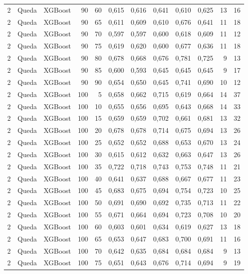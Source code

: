 \begin{longtable}{@{}rllrrrrrrrrr@{}}
2 & Queda & XGBoost & 90 & 60 & 0,615 & 0,616 & 0,641 & 0,610 & 0,625 & 13 & 16 \\
2 & Queda & XGBoost & 90 & 65 & 0,611 & 0,609 & 0,610 & 0,676 & 0,641 & 11 & 18 \\
2 & Queda & XGBoost & 90 & 70 & 0,597 & 0,597 & 0,600 & 0,618 & 0,609 & 11 & 12 \\
2 & Queda & XGBoost & 90 & 75 & 0,619 & 0,620 & 0,600 & 0,677 & 0,636 & 11 & 18 \\
2 & Queda & XGBoost & 90 & 80 & 0,678 & 0,668 & 0,676 & 0,781 & 0,725 & 9 & 13 \\
2 & Queda & XGBoost & 90 & 85 & 0,600 & 0,593 & 0,645 & 0,645 & 0,645 & 9 & 17 \\
2 & Queda & XGBoost & 90 & 90 & 0,654 & 0,650 & 0,645 & 0,741 & 0,690 & 10 & 12 \\
2 & Queda & XGBoost & 100 & 5 & 0,658 & 0,662 & 0,715 & 0,619 & 0,664 & 14 & 37 \\
2 & Queda & XGBoost & 100 & 10 & 0,655 & 0,656 & 0,695 & 0,643 & 0,668 & 14 & 33 \\
2 & Queda & XGBoost & 100 & 15 & 0,659 & 0,659 & 0,702 & 0,661 & 0,681 & 13 & 32 \\
2 & Queda & XGBoost & 100 & 20 & 0,678 & 0,678 & 0,714 & 0,675 & 0,694 & 13 & 26 \\
2 & Queda & XGBoost & 100 & 25 & 0,652 & 0,652 & 0,688 & 0,653 & 0,670 & 13 & 24 \\
2 & Queda & XGBoost & 100 & 30 & 0,615 & 0,612 & 0,632 & 0,663 & 0,647 & 13 & 26 \\
2 & Queda & XGBoost & 100 & 35 & 0,722 & 0,718 & 0,743 & 0,753 & 0,748 & 11 & 21 \\
2 & Queda & XGBoost & 100 & 40 & 0,641 & 0,637 & 0,688 & 0,667 & 0,677 & 11 & 23 \\
2 & Queda & XGBoost & 100 & 45 & 0,683 & 0,675 & 0,694 & 0,754 & 0,723 & 10 & 25 \\
2 & Queda & XGBoost & 100 & 50 & 0,691 & 0,690 & 0,692 & 0,735 & 0,713 & 11 & 22 \\
2 & Queda & XGBoost & 100 & 55 & 0,671 & 0,664 & 0,694 & 0,723 & 0,708 & 10 & 20 \\
2 & Queda & XGBoost & 100 & 60 & 0,603 & 0,601 & 0,634 & 0,619 & 0,627 & 13 & 18 \\
2 & Queda & XGBoost & 100 & 65 & 0,653 & 0,647 & 0,683 & 0,700 & 0,691 & 11 & 16 \\
2 & Queda & XGBoost & 100 & 70 & 0,642 & 0,635 & 0,684 & 0,684 & 0,684 & 9 & 13 \\
2 & Queda & XGBoost & 100 & 75 & 0,651 & 0,643 & 0,676 & 0,714 & 0,694 & 9 & 19 \\

\end{longtable}
